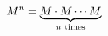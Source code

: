 \documentclass[preview]{standalone}
\begin{document}
\begin{align*}
\special{dvisvgm:raw <g id='unique000'>}M^n = \underbrace{M \cdot M \cdots M}_{n \text{ times}}\special{dvisvgm:raw </g>}
\end{align*}
\end{document}
